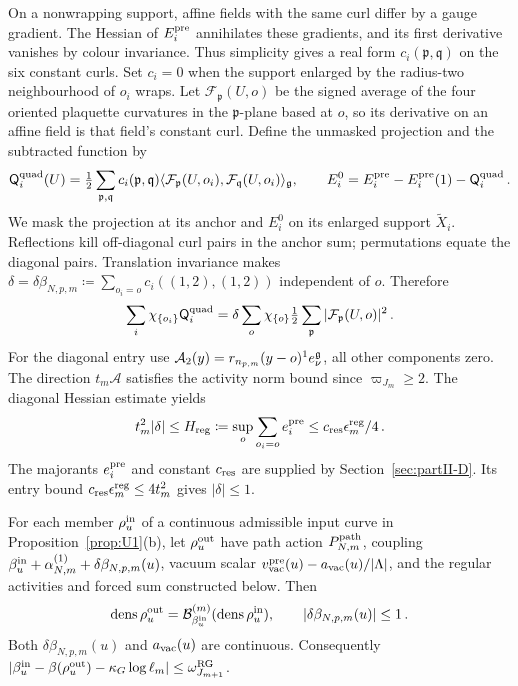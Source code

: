 On a nonwrapping support, affine fields with the same curl differ by a gauge gradient. The Hessian of $E_i^{\rm pre}$ annihilates these gradients, and its first derivative vanishes by colour invariance. Thus simplicity gives a real form $c_i(\mathfrak p,\mathfrak q)$ on the six constant curls. Set $c_i=0$ when the support enlarged by the radius-two neighbourhood of $o_i$ wraps. Let $\mathcal F_{\mathfrak p}(U,o)$ be the signed average of the four oriented plaquette curvatures in the $\mathfrak p$-plane based at $o$, so its derivative on an affine field is that field's constant curl. Define the unmasked projection and the subtracted function by
\begin{equation}\label{eq:C-local-projection}
 \mathsf Q_i^{\rm quad}(U)=\tfrac12\sum_{\mathfrak p,\mathfrak q}c_i(\mathfrak p,\mathfrak q)
 \langle\mathcal F_{\mathfrak p}(U,o_i),\mathcal F_{\mathfrak q}(U,o_i)\rangle_{\mathfrak{g}},
 \qquad E_i^0=E_i^{\rm pre}-E_i^{\rm pre}(1)-\mathsf Q_i^{\rm quad}\,.
\end{equation}
We mask the projection at its anchor and $E_i^0$ on its enlarged support $\widetilde X_i$. Reflections kill off-diagonal curl pairs in the anchor sum; permutations equate the diagonal pairs. Translation invariance makes
$\delta=\delta\beta_{N,p,m}\coloneqq\sum_{o_i=o}c_i((1,2),(1,2))$ independent of $o$. Therefore
\begin{equation}\label{eq:C-isotropic-projection}
 \sum_i\chi_{\{o_i\}}\mathsf Q_i^{\rm quad}
 =\delta\sum_o\chi_{\{o\}}\tfrac12\sum_{\mathfrak p}|\mathcal F_{\mathfrak p}(U,o)|^2\,.
\end{equation}
For the diagonal entry use $\mathcal A_2(y)=r_{n_{p,m}}(y-o)^1e_\nu^{\mathfrak{g}}$, all other components zero. The direction $t_m\mathcal A$ satisfies the activity norm bound since $\varpi_{J_m}\ge2$. The diagonal Hessian estimate yields
\begin{equation}\label{eq:C-delta-bound}
 t_m^2|\delta|\le H_{\rm reg}\coloneqq\sup_o\sum_{o_i=o}e_i^{\rm pre}
 \le c_{\rm res}\epsilon_m^{\rm reg}/4\,.
\end{equation}
The majorants $e_i^{\rm pre}$ and constant $c_{\rm res}$ are supplied by Section~\ref{sec:partII-D}. Its entry bound $c_{\rm res}\epsilon_m^{\rm reg}\le4t_m^2$ gives $|\delta|\le1$.

\begin{lemma}\label{lem:C-reset}
For each member $\rho^{\rm in}_u$ of a continuous admissible input curve in Proposition~\ref{prop:U1}(b), let $\rho^{\rm out}_u$ have path action $P^{\mathrm{path}}_{N,m}$, coupling $\beta^{\rm in}_u+\alpha^{(1)}_{N,m}+\delta\beta_{N,p,m}(u)$, vacuum scalar $v_{\rm vac}^{\rm pre}(u)-a_{\rm vac}(u)/|\Lambda|$, and the regular activities and forced sum constructed below. Then
\begin{equation}\label{eq:C-exact-reset}
 \operatorname{dens}\rho^{\rm out}_u=\mathcal{B}^{(m)}_{\beta^{\rm in}_u}(\operatorname{dens}\rho^{\rm in}_u),
 \qquad |\delta\beta_{N,p,m}(u)|\le1\,.
\end{equation}
Both $\delta\beta_{N,p,m}(u)$ and $a_{\rm vac}(u)$ are continuous. Consequently $|\beta^{\rm in}_u-\beta(\rho^{\rm out}_u)-\kappa_G\log\ell_m|\le\omega_{J_{m+1}}^{\rm RG}$.
\end{lemma}

